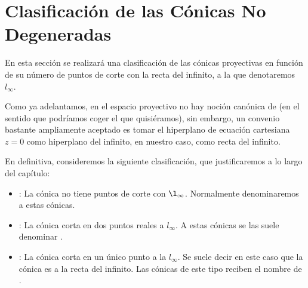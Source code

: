 \section{Clasificación de las Cónicas No Degeneradas}
En esta sección se realizará una clasificación de las cónicas proyectivas en función de su número de puntos de corte con la recta del infinito, a la que denotaremos $l_\infty$.

Como ya adelantamos, en el espacio proyectivo no hay noción canónica de  (en el sentido que podríamos coger el que quisiéramos), sin embargo, un convenio bastante ampliamente aceptado es tomar el hiperplano de ecuación cartesiana $z=0$ como hiperplano del infinito, en nuestro caso, como recta del infinito.

En definitiva, consideremos la siguiente clasificación, que justificaremos a lo largo del capítulo:
\begin{itemize}
	\item {}: La cónica no tiene puntos de corte con $\l_{\infty}$. Normalmente denominaremos  a estas cónicas.
	\item {}: La cónica corta en dos puntos reales a $l_\infty$. A estas cónicas se las suele denominar .
	\item {}: La cónica corta en un único punto a la $l_\infty$. Se suele decir en este caso que la cónica es  a la recta del infinito. Las cónicas de este tipo reciben el nombre de .
\end{itemize}
